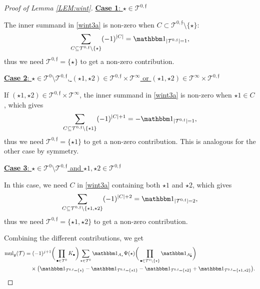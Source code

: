 \documentclass[%
11pt,  reqno]{amsart}
\newcommand{\5}{\textup{V}}
\newcommand{\noi}{\noindent}
\newcommand{\ind}{\mathbbm 1}
\theoremstyle{remark}
\newcommand{\bul}{\bullet}
\newcommand{\TT}{\mathcal{T}}
\newcommand{\gfrak}{\mathfrak{g}}
\newcommand{\ff}{\mathfrak{f}}
\DeclareMathOperator{\mul}{mul}
\numberwithin{equation}{section}
\numberwithin{theorem}{section}
\begin{document}
\begin{proof}[Proof of Lemma \ref{LEM:wint}]





 
\smallskip 

\noi
\underline{\textbf{Case 1}: $\star\in \TT^{0,\ff}$  }

The inner summand in \eqref{wint3a} is non-zero when $C\subset \TT^{0,\ff} \setminus \{\star\}$:
\begin{align}
\sum_{C\subseteq \TT^{0,\ff} \setminus\{\star\}} (-1)^{|C|} = \ind_{|\TT^{0,\ff}|=1}, 
\end{align}
thus we need $\TT^{0,\ff} = \{\star\}$ to get a non-zero contribution. 


\smallskip 
\noi
\underline{\textbf{Case 2}: $\star\in \TT^0\setminus\TT^{0,\ff}$, $(\star1, \star2) \in \TT^{0,\ff} \times \TT^\infty$ or $(\star1, \star2) \in \TT^\infty \times \TT^{0,\ff}$}

If $(\star1, \star2) \in \TT^{0,\ff} \times \TT^\infty$,
the inner summand in \eqref{wint3a} is non-zero when $ \star1 \in C$, which gives
\begin{align}
\sum_{C\subseteq \TT^{0,\ff} \setminus\{\star1\}} (-1)^{|C|+1} = - \ind_{|\TT^{0,\ff}|=1}, 
\end{align}
thus we need $\TT^{0,\ff} = \{\star1\}$ to get a non-zero contribution. This is analogous for the other case by symmetry.

\smallskip 

\noi
\underline{\textbf{Case 3}: $\star \in \TT^{0} \setminus \TT^{0,\ff}$ and $\star1,\star2\in \TT^{0,\ff}$}

In this case, we need $C$ in \eqref{wint3a} containing both $\star1$ and $\star2$, which gives
\begin{align}
\sum_{C\subseteq \TT^{0,\ff} \setminus\{\star1, \star2\}} (-1)^{|C|+2} = \ind_{|\TT^{0,\ff}|=2}, 
\end{align}
thus we need $\TT^{0,\ff} = \{\star1, \star2\}$ to get a non-zero contribution.

Combining the different contributions, we get
\begin{align}\label{mulg}
{\mul}_\gfrak (\TT) 
& =
(-1)^{j+1}
		\bigg( \prod_{\bul \in \TT^0} K_\bul \bigg) 
 \sum_{\star \in \TT^0} \ind_{A_\star} \Psi(\star)
		\bigg( \prod_{\bul\in\TT^0 \setminus\{\star\}} \ind_{A_\bul^c}\bigg)
\\
&
\quad \times 
 \big( 
\ind_{ \TT^{0,\ff}  = \{\star\}} 
- \ind_{ \TT^{0,\ff}  = \{\star1\}}  
- \ind_{ \TT^{0,\ff}  = \{\star2\}} 
+\ind_{ \TT^{0,\ff}  = \{\star1, \star2\}}
\big).
\end{align}



\end{proof}
\end{document}
